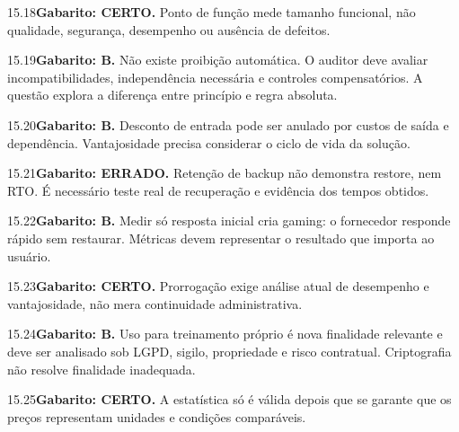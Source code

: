 \begin{solucao}{15.18}\textbf{Gabarito: CERTO.} Ponto de função mede tamanho funcional, não qualidade, segurança, desempenho ou ausência de defeitos.\end{solucao}
\begin{solucao}{15.19}\textbf{Gabarito: B.} Não existe proibição automática. O auditor deve avaliar incompatibilidades, independência necessária e controles compensatórios. A questão explora a diferença entre princípio e regra absoluta.\end{solucao}
\begin{solucao}{15.20}\textbf{Gabarito: B.} Desconto de entrada pode ser anulado por custos de saída e dependência. Vantajosidade precisa considerar o ciclo de vida da solução.\end{solucao}
\begin{solucao}{15.21}\textbf{Gabarito: ERRADO.} Retenção de backup não demonstra restore, nem RTO. É necessário teste real de recuperação e evidência dos tempos obtidos.\end{solucao}
\begin{solucao}{15.22}\textbf{Gabarito: B.} Medir só resposta inicial cria gaming: o fornecedor responde rápido sem restaurar. Métricas devem representar o resultado que importa ao usuário.\end{solucao}
\begin{solucao}{15.23}\textbf{Gabarito: CERTO.} Prorrogação exige análise atual de desempenho e vantajosidade, não mera continuidade administrativa.\end{solucao}
\begin{solucao}{15.24}\textbf{Gabarito: B.} Uso para treinamento próprio é nova finalidade relevante e deve ser analisado sob LGPD, sigilo, propriedade e risco contratual. Criptografia não resolve finalidade inadequada.\end{solucao}
\begin{solucao}{15.25}\textbf{Gabarito: CERTO.} A estatística só é válida depois que se garante que os preços representam unidades e condições comparáveis.\end{solucao}

